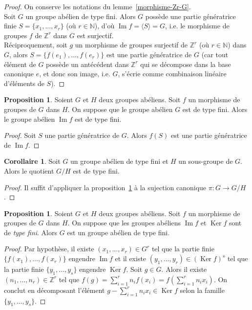 \documentclass{report}
\newcommand{\Z}{\mathbb{Z}}
\newcommand{\N}{\mathbb{N}}
\newcommand{\im}{\mathop{\mathrm{Im}}\nolimits}
\renewcommand{\ker}{\mathop{\mathrm{Ker}}\nolimits}
\newcommand{\dis}{\displaystyle}
\theoremstyle{definition}
\newtheorem{prop}[defi]{Proposition}
\newtheorem{coro}[defi]{Corollaire}
\theoremstyle{remark}
\begin{document}
\begin{proof}
On conserve les notations du lemme~\ref{morphisme-Zr-G}. \\
Soit $G$ un groupe abélien de type fini. Alors $G$ possède une partie génératrice finie $S=\{x_1, \ldots, x_r \}$ (où $r \in \N$), d'où $\im f=\langle S\rangle=G$,
i.e. le morphisme de groupes $f$ de $\Z^r$ dans $G$ est surjectif. \\
Réciproquement, soit $g$ un morphisme de groupes surjectif de $\Z^r$ (où $r \in \N$) dans $G$, alors $S=\{f(e_1), \ldots, f(e_r) \}$ est une partie génératrice de $G$ (car tout élément de $G$ possède un antécédent dans $\Z^r$ qui se décompose dans la base canonique $e$, et donc son image, i.e. $G$, s'écrie comme combinaison linéaire d'éléments de $S$). 
\end{proof}

\begin{prop}\label{image-type-fini}
Soient $G$ et $H$ deux groupes abéliens. Soit $f$ un morphisme de groupes de $G$ dans $H$. On suppose que le groupe abélien $G$ est de type fini. Alors le groupe abélien $\im f$ est de type fini.
\end{prop}

\begin{proof}
Soit $S$ une partie génératrice de $G$. Alors $f(S)$ est une partie génératrice de $\im f$.
\end{proof}

\begin{coro}
Soit $G$ un groupe ab\'elien de type fini et $H$ un sous-groupe de $G$. Alors le quotient $G/H$ est de type fini.
\end{coro}

\begin{proof}
Il suffit d'appliquer la proposition~\ref{image-type-fini} \`a la sujection canonique $\pi:G\to G/H$.
\end{proof}

\begin{prop}\label{g-type-fini-par-morphisme}
Soient $G$ et $H$ deux groupes abéliens. Soit $f$ un morphisme de groupes de $G$ dans $H$. On suppose que les groupes abéliens $\im f$ et $\ker f$ sont de \textit{type fini}. Alors $G$ est un groupe abélien de type fini.
\end{prop}

\begin{proof}
Par hypothèse, il existe $(x_1, \ldots, x_r) \in G^r$ tel que la partie finie $\{f(x_1), \ldots, f(x_r) \}$ engendre $\im f$ et il existe $(y_1, \ldots, y_r) \in (\ker f)^s$ tel que la partie finie $\{y_1, \ldots, y_s \}$ engendre $\ker f$. Soit $g \in G$. Alors il existe $(n_1, \ldots, n_r) \in \Z^r$ tel que $f(g)=\dis \sum_{i=1}^r n_if(x_i)=f\left(\sum_{i=1}^r n_ix_i\right)$. On conclut en décomposant l'élément $g-\dis \sum_{i=1}^r n_ix_i\in \ker f$ selon la famille $\{y_1, \ldots, y_s\}$.
\end{proof}
\end{document}
